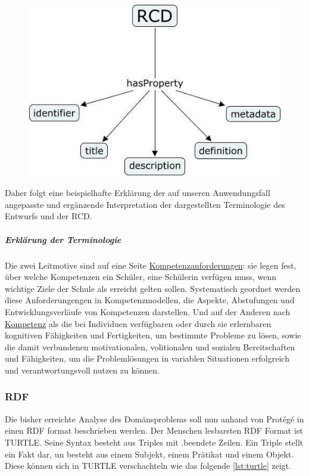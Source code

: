 \documentclass[
12pt,
english,
ngerman,
headsepline,
twoside,
openright,
numbers=noenddot,version=first
]{scrreprt}
\begin{document}
\begin{figure}
	\includegraphics[width=0.9\linewidth]{pics/RCD.jpg}
\end{figure}


Daher folgt eine beispielhafte Erklärung der auf unseren Anwendungsfall angepasste und ergänzende Interpretation der dargestellten Terminologie des Entwurfs und der RCD.




\subparagraph{Erklärung der Terminologie}Die zwei Leitmotive sind auf eine Seite \underline{Kompetenzanforderungen}: sie legen fest, über welche Kompetenzen ein Schüler, eine Schülerin verfügen muss, wenn wichtige Ziele der Schule als erreicht gelten sollen. Systematisch geordnet werden diese Anforderungengen in Kompetenzmodellen, die Aspekte, Abstufungen und Entwicklungsverläufe von Kompetenzen darstellen\cite{competence}. Und auf der Anderen nach \underline{\Gls{Kompetenz}} als die bei Individuen verfügbaren oder durch sie erlernbaren kognitiven Fähigkeiten und Fertigkeiten, um bestimmte Probleme zu lösen, sowie die damit verbundenen motivationalen, volitionalen und sozialen Bereitschaften und Fähigkeiten, um die Problemlösungen in variablen Situationen erfolgreich und verantwortungsvoll nutzen zu können\cite{weinert2002leistungsmessungen}.

\subsubsection{RDF}
Die bisher erreichte Analyse des Domänsproblems soll nun anhand von Protégé in einen \acrfull{RDF} format beschrieben werden. Der Menschen lesbarsten \acrshort{RDF} Format ist \acrfull{TURTLE}. Seine Syntax besteht aus Triples mit \glqq .\grqq beendete Zeilen. Ein Triple stellt ein Fakt dar, un besteht aus einem Subjekt, einem Prätikat und einem Objekt. Diese können sich in TURTLE verschachteln wie das folgende \autoref{lst:turtle} zeigt. 
\end{document}
